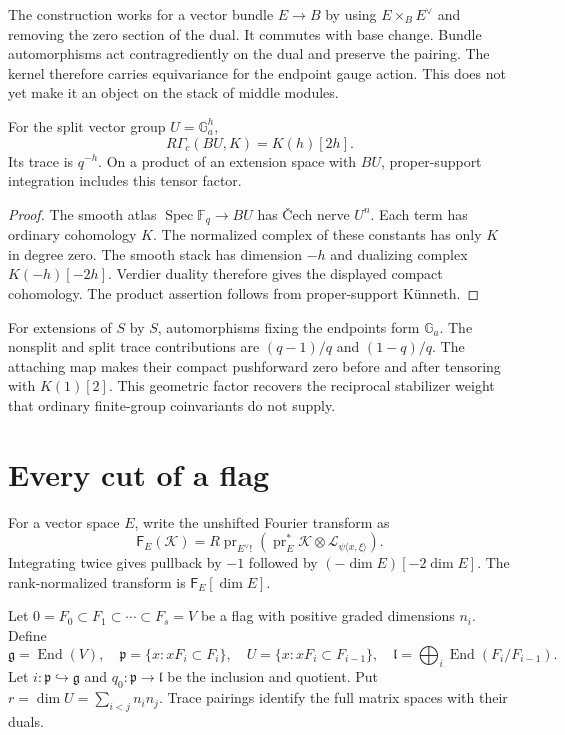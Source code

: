 The construction works for a vector bundle $E\to B$ by using
$E\times_BE^\vee$ and removing the zero section of the dual.
It commutes with base change. Bundle automorphisms act
contragrediently on the dual and preserve the pairing. The kernel
therefore carries equivariance for the endpoint gauge action.
This does not yet make it an object on the stack of middle modules.

\begin{proposition}\label{v4-arith:hall:prop:stabilizer}
For the split vector group $U=\mathbb G_a^h$,
\[
 R\Gamma_c(BU,K)=K(h)[2h].
\]
Its trace is $q^{-h}$. On a product of an extension space with
$BU$, proper-support integration includes this tensor factor.
\end{proposition}
\begin{proof}
The smooth atlas $\operatorname{Spec}\mathbb F_q\to BU$ has
\v Cech nerve $U^n$. Each term has ordinary cohomology $K$.
The normalized complex of these constants has only $K$ in degree zero.
The smooth stack has dimension $-h$ and dualizing complex
$K(-h)[-2h]$. Verdier duality therefore gives the displayed compact
cohomology. The product assertion follows from proper-support
K\"unneth.
\end{proof}

For extensions of $S$ by $S$, automorphisms fixing the endpoints
form $\mathbb G_a$. The nonsplit and split trace contributions are
$(q-1)/q$ and $(1-q)/q$.
The attaching map makes their compact pushforward zero before and
after tensoring with $K(1)[2]$. This geometric factor recovers the
reciprocal stabilizer weight that ordinary finite-group coinvariants
do not supply.

\section{Every cut of a flag}
\label{v4-arith:hall:sec:flags}

For a vector space $E$, write the unshifted Fourier transform as
\[
 \mathsf F_E(\mathcal K)=R\operatorname{pr}_{E^\vee!}
   (\operatorname{pr}_E^*\mathcal K
       \otimes\mathcal L_{\psi\langle x,\xi\rangle}).
\]
Integrating twice gives pullback by $-1$ followed by
$(-\dim E)[-2\dim E]$. The rank-normalized transform is
$\mathsf F_E[\dim E]$.

Let $0=F_0\subset F_1\subset\cdots\subset F_s=V$ be a flag
with positive graded dimensions $n_i$. Define
\[
 \mathfrak g=\operatorname{End}(V),\quad
 \mathfrak p=\{x:xF_i\subset F_i\},\quad
 U=\{x:xF_i\subset F_{i-1}\},\quad
 \mathfrak l=\bigoplus_i\operatorname{End}(F_i/F_{i-1}).
\]
Let $i:\mathfrak p\hookrightarrow\mathfrak g$ and
$q_0:\mathfrak p\to\mathfrak l$ be the inclusion and quotient.
Put $r=\dim U=\sum_{i<j}n_in_j$.
Trace pairings identify the full matrix spaces with their duals.

